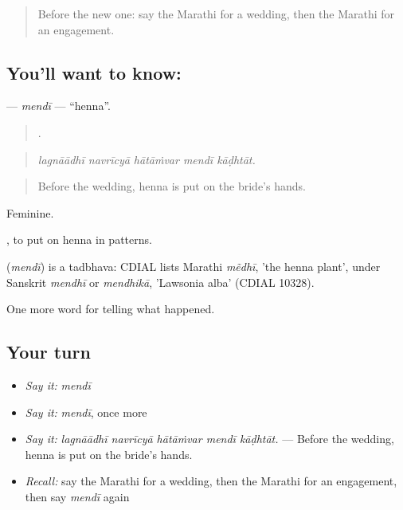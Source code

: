 \label{lesson:MR-C316-mendi}



\begin{quote}
Before the new one: say the Marathi for a wedding, then the Marathi for an engagement.
\end{quote}

\subsection*{You'll want to know: }
\textbf{} — \emph{mendī} — \textquotedblleft{}henna\textquotedblright{}.

\begin{quote}
    .
\end{quote}

\begin{quote}
\emph{lagnāādhī navrīcyā hātāṁvar mendī kāḍhtāt.}
\end{quote}

\begin{quote}
Before the wedding, henna is put on the bride's hands.
\end{quote}

Feminine.

 , to put on henna in patterns.

\begin{cousinweb}
\textbf{} (\emph{mendī}) is a tadbhava: CDIAL lists Marathi \emph{mẽdhī}, 'the henna plant', under Sanskrit \emph{mendhī} or \emph{mendhikā}, 'Lawsonia alba' (CDIAL 10328).
\end{cousinweb}

\begin{grammarlens}[title={What you've built}]
One more word for telling what happened.
\end{grammarlens}

\subsection*{Your turn}
\begin{itemize}
\raggedright
  \item \emph{Say it:} \emph{mendī}
  \item \emph{Say it:} \emph{mendī}, once more
  \item \emph{Say it:} \emph{lagnāādhī navrīcyā hātāṁvar mendī kāḍhtāt.} — Before the wedding, henna is put on the bride's hands.
  \item \emph{Recall:} say the Marathi for a wedding, then the Marathi for an engagement, then say \emph{mendī} again
\end{itemize}

